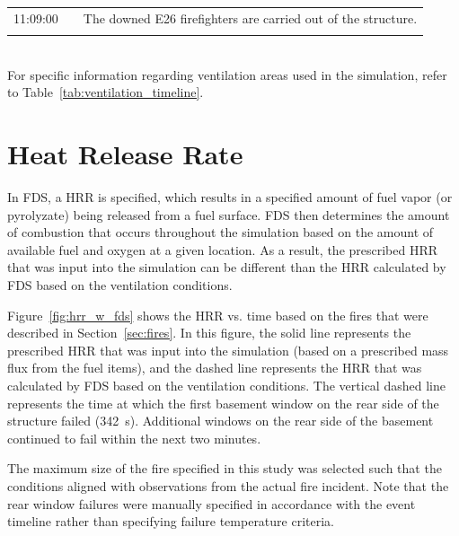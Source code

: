 \documentclass[12pt,oneside]{book}
\begin{document}
\begin{table}[!ht]
\begin{tabular}{ccl}
11:09:00       &              &  The downed E26 firefighters are carried out of the structure.       \\
               &              &                                                                      \\
\bottomrule
\end{tabular}
\footnotesize
\\ For specific information regarding ventilation areas used in the simulation, refer to Table~\ref{tab:ventilation_timeline}.
\normalsize
\label{tab:combined_timeline}
\end{table}


\clearpage


\section{Heat Release Rate}
\label{sec:HRR}

In FDS, a HRR is specified, which results in a specified amount of fuel vapor (or pyrolyzate) being released from a fuel surface. FDS then determines the amount of combustion that occurs throughout the simulation based on the amount of available fuel and oxygen at a given location. As a result, the prescribed HRR that was input into the simulation can be different than the HRR calculated by FDS based on the ventilation conditions.

Figure~\ref{fig:hrr_w_fds} shows the HRR vs. time based on the fires that were described in Section~\ref{sec:fires}. In this figure, the solid line represents the prescribed HRR that was input into the simulation (based on a prescribed mass flux from the fuel items), and the dashed line represents the HRR that was calculated by FDS based on the ventilation conditions. The vertical dashed line represents the time at which the first basement window on the rear side of the structure failed (342~s). Additional windows on the rear side of the basement continued to fail within the next two minutes.

The maximum size of the fire specified in this study was selected such that the conditions aligned with observations from the actual fire incident. Note that the rear window failures were manually specified in accordance with the event timeline rather than specifying failure temperature criteria.
\end{document}
